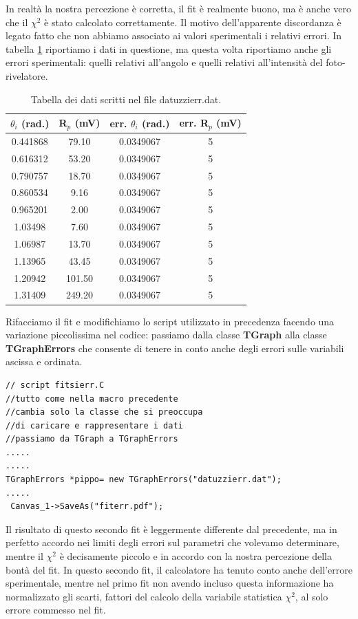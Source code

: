 \documentclass[11pt,fleqn]{book} %
\begin{document}
In realtà la nostra percezione è corretta, il fit è realmente buono, ma è anche vero che il $\chi^2$ è stato calcolato correttamente. Il motivo dell'apparente discordanza è legato fatto che non abbiamo associato ai valori sperimentali i relativi errori. In tabella \ref{datuzzierr} riportiamo i dati in questione, ma questa volta riportiamo anche gli errori sperimentali: quelli relativi all'angolo e quelli relativi all'intensità del foto-rivelatore.

\begin{table}
\centering
\caption{Tabella dei dati scritti nel file datuzzierr.dat.\label{datuzzierr}}
\vspace{0.3cm}
\begin{tabular}{c|c|c|c}
$\theta_i$ (rad.) & R$_p$ (mV)& err. $\theta_i$ (rad.) & err.   R$_p$ (mV)\\
\hline
0.441868 & 79.10 &   0.0349067  &  5\\
\hline
0.616312 & 53.20 &   0.0349067  &  5\\
\hline
0.790757 & 18.70  &   0.0349067  &  5\\
\hline
0.860534 & 9.16 &   0.0349067  &  5\\
\hline
0.965201 & 2.00 &   0.0349067  &  5\\
\hline
1.03498 & 7.60 &   0.0349067  &  5\\
\hline
1.06987 & 13.70 &   0.0349067  &  5\\
\hline
1.13965 & 43.45 &   0.0349067  &  5\\
\hline
1.20942 & 101.50 &   0.0349067  &  5\\
\hline
1.31409 & 249.20  &   0.0349067  &  5
\end{tabular}
\end{table}

Rifacciamo il fit e modifichiamo lo script utilizzato in precedenza facendo una variazione piccolissima nel codice: passiamo dalla classe \textbf{TGraph} alla classe \textbf{TGraphErrors} che consente di tenere in conto anche degli errori sulle variabili ascissa e ordinata.

\begin{verbatim}
// script fitsierr.C
//tutto come nella macro precedente
//cambia solo la classe che si preoccupa
//di caricare e rappresentare i dati
//passiamo da TGraph a TGraphErrors
.....
.....
TGraphErrors *pippo= new TGraphErrors("datuzzierr.dat");
.....
 Canvas_1->SaveAs("fiterr.pdf");
\end{verbatim}

Il risultato di questo secondo fit è leggermente differente dal precedente, ma in perfetto accordo nei limiti degli errori sul parametri che volevamo determinare, mentre il $\chi^2$ è decisamente piccolo e in accordo con la nostra percezione della bontà del fit. In questo secondo fit, il calcolatore ha tenuto conto anche dell'errore sperimentale, mentre nel primo fit non avendo incluso questa informazione ha normalizzato gli scarti, fattori del calcolo della variabile statistica $\chi^2$, al solo errore commesso nel fit.
\end{document}
